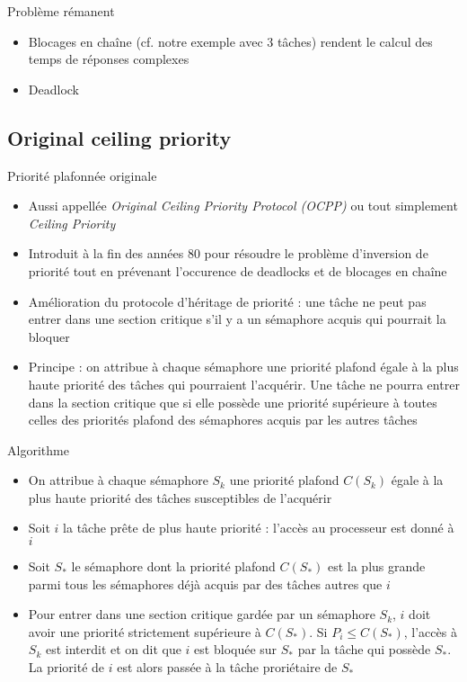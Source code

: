 \begin{frame}{Problème rémanent} 
  \begin{itemize}
  \item Blocages en  chaîne (cf. notre exemple avec  3 tâches) rendent
    le calcul des temps de réponses complexes
  \item Deadlock
  \end{itemize}
\end{frame}

\subsection{Original ceiling priority}

\begin{frame}{Priorité plafonnée originale}
  \begin{itemize} 
  \item  Aussi  appellée   \emph{Original  Ceiling  Priority  Protocol
      (OCPP)} ou tout simplement \emph{Ceiling Priority}
  \item Introduit  à la  fin des années  80 pour résoudre  le problème
    d'inversion de priorité tout en prévenant l'occurence de deadlocks
    et de blocages en chaîne
  \item Amélioration  du protocole d'héritage de priorité  : une tâche
    ne peut pas entrer dans une section critique s'il y a un sémaphore
    acquis qui pourrait la bloquer
  \item Principe : on attribue à chaque sémaphore une priorité plafond
    égale  à  la  plus   haute  priorité  des  tâches  qui  pourraient
    l'acquérir. Une  tâche ne pourra  entrer dans la  section critique
    que si  elle possède une  priorité supérieure à toutes  celles des
    priorités plafond des sémaphores acquis par les autres tâches
  \end{itemize} 
\end{frame} 

\begin{frame}{Algorithme}
  \begin{itemize} 
  \item  On attribue  à chaque  sémaphore $S_k$  une  priorité plafond
    $C(S_k)$ égale à la plus haute priorité des tâches susceptibles de
    l'acquérir
  \item Soit  $i$ la tâche prête  de plus haute priorité  : l'accès au
    processeur est donné à $i$
  \item Soit $S_*$ le sémaphore  dont la priorité plafond $C(S_*)$ est
    la  plus grande  parmi tous  les  sémaphores déjà  acquis par  des
    tâches autres que $i$
  \item Pour entrer dans une  section critique gardée par un sémaphore
    $S_k$,  $i$  doit  avoir  une priorité  strictement  supérieure  à
    $C(S_*)$. Si  $P_i ≤ C(S_*)$, l'accès  à $S_k$ est  interdit et on
    dit  que  $i$ est  bloquée  sur $S_*$  par  la  tâche qui  possède
    $S_*$. La priorité de $i$  est alors passée à la tâche proriétaire
    de $S_*$
  \end{itemize} 
\end{frame} 

